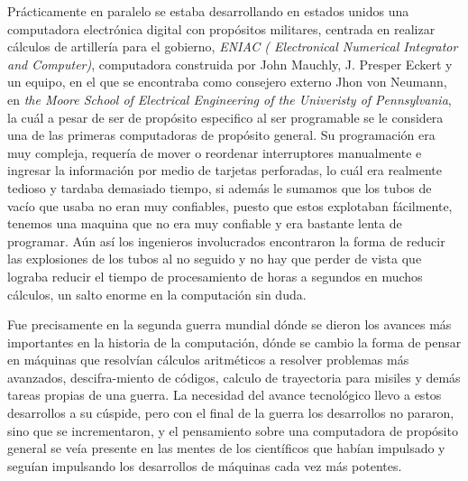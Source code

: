 \documentclass[letterpaper,12pt,oneside]{book}
\begin{document}
		Prácticamente en paralelo se estaba desarrollando
		en estados unidos una computadora electrónica digital con propósitos militares, centrada en realizar cálculos de artillería para el gobierno,
		\textit{ENIAC ( Electronical Numerical Integrator and Computer)}, computadora construida por John Mauchly, J. Presper Eckert y un equipo, en
		el que se encontraba como consejero externo Jhon von Neumann, en
		\textit{the Moore School of Electrical Engineering of the Univeristy of Pennsylvania}, la cuál a pesar de ser de propósito especifico
		al ser programable se le considera una de las primeras computadoras de propósito general. Su programación era muy compleja, requería de mover o reordenar
		interruptores manualmente e ingresar la información por medio de tarjetas perforadas, 
		lo cuál era realmente tedioso y tardaba demasiado tiempo, si además le sumamos que  los tubos de vacío que usaba no eran muy confiables, puesto que estos explotaban 	
		fácilmente, tenemos una maquina que no era muy confiable y era bastante lenta de programar. Aún así los ingenieros involucrados encontraron la forma de reducir
		las explosiones de los tubos al no  seguido y no hay que perder de vista que lograba reducir el tiempo de procesamiento de horas a segundos en muchos 
		cálculos, un salto enorme en la computación sin duda\cite{ifrah_universal_2001}.
		
		
		Fue precisamente en la segunda guerra mundial dónde se dieron los avances más importantes en la historia de la computación, dónde se cambio la forma de
		pensar en máquinas que resolvían cálculos aritméticos a resolver problemas más avanzados, descifra-miento de códigos, calculo de trayectoria para
		misiles y demás tareas propias de una guerra. La necesidad del avance tecnológico llevo a estos desarrollos a su cúspide, pero con el final de
		la guerra los desarrollos no pararon, sino que se incrementaron, y el pensamiento sobre una computadora de propósito general se veía
		presente en las mentes de los científicos que habían impulsado y seguían impulsando los desarrollos de máquinas cada vez más potentes.
		
\end{document}
